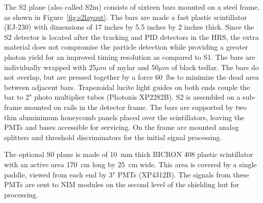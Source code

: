 {The S2 plane (also called S2m) consists of sixteen bars mounted on a steel
frame, as shown in Figure~\ref{fig:s2layout}. The bars are made a fast
plastic scintillator (EJ-230) with dimensions of 17 inches by
5.5 inches by 2 inches thick. Since the S2 detector is located after
the tracking and PID detectors in the HRS, the extra material does not
compromise the particle detection while providing a greater photon yield
for an improved timing resolution as compared to S1. The bars are
individually wrapped with 25{$\mu m$} of mylar and 50{$\mu m$} of
black tedlar. The bars do not overlap, but are pressed together by a force
60~lbs to minimize the dead area between adjacent bars. Trapezoidal lucite
light guides on both ends couple the bar to 2" photo multiplier tubes
(Photonis XP2282B). S2 is assembled on a sub-frame mounted on rails in the
detector frame. The bars are supported by two thin aluminimum honeycomb
panels placed over the scintillators, leaving the PMTs and bases accessible
for servicing. On the frame are mounted analog splitters and threshold
discriminators for the initial signal processing.

The optional S0 plane is made of 10~mm thick BICRON 408 plastic
scintillator with an active area 170~cm long by 25~cm wide. This area is
covered by a single paddle, viewed from each end by 3" PMTs (XP4312B). The
signals from these PMTs are sent to NIM modules on the second level of
the shielding hut for processing.

}
